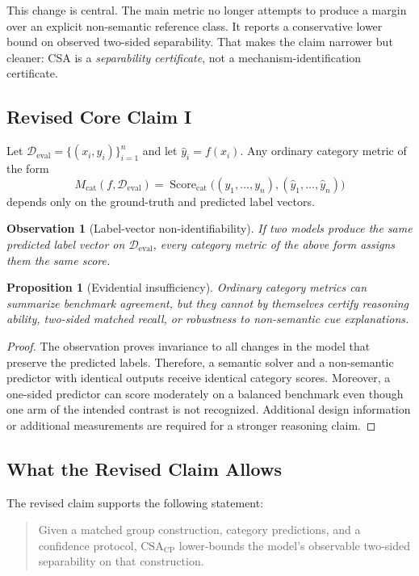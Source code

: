 \documentclass[10pt,conference]{IEEEtran}
\newtheorem{proposition}{Proposition}
\newtheorem{observation}{Observation}
\theoremstyle{remark}
\newcommand{\CSACP}{\mathrm{CSA}_{\mathrm{CP}}}
\newcommand{\EvalSet}{\mathcal{D}_{\mathrm{eval}}}
\newcommand{\CatMetric}{M_{\mathrm{cat}}}
\newcommand{\CatScore}{\operatorname{Score}_{\mathrm{cat}}}
\begin{document}
This change is central.  The main metric no longer attempts to produce a margin over an explicit non-semantic reference class.  It reports a conservative lower bound on observed two-sided separability.  That makes the claim narrower but cleaner: CSA is a \emph{separability certificate}, not a mechanism-identification certificate.

\subsection{Revised Core Claim I}

Let $\EvalSet=\{(x_i,y_i)\}_{i=1}^{n}$ and let $\hat y_i=f(x_i)$.  Any ordinary category metric of the form
\[
\CatMetric(f,\EvalSet)
=
\CatScore\bigl((y_1,\ldots,y_n),(\hat y_1,\ldots,\hat y_n)\bigr)
\]
depends only on the ground-truth and predicted label vectors.

\begin{observation}[Label-vector non-identifiability]
If two models produce the same predicted label vector on $\EvalSet$, every category metric of the above form assigns them the same score.
\end{observation}

\begin{proposition}[Evidential insufficiency]
Ordinary category metrics can summarize benchmark agreement, but they cannot by themselves certify reasoning ability, two-sided matched recall, or robustness to non-semantic cue explanations.
\end{proposition}

\begin{proof}
The observation proves invariance to all changes in the model that preserve the predicted labels.  Therefore, a semantic solver and a non-semantic predictor with identical outputs receive identical category scores.  Moreover, a one-sided predictor can score moderately on a balanced benchmark even though one arm of the intended contrast is not recognized.  Additional design information or additional measurements are required for a stronger reasoning claim.
\end{proof}

\subsection{What the Revised Claim Allows}

The revised claim supports the following statement:

\begin{quote}
Given a matched group construction, category predictions, and a confidence protocol, $\CSACP$ lower-bounds the model's observable two-sided separability on that construction.
\end{quote}
\end{document}
